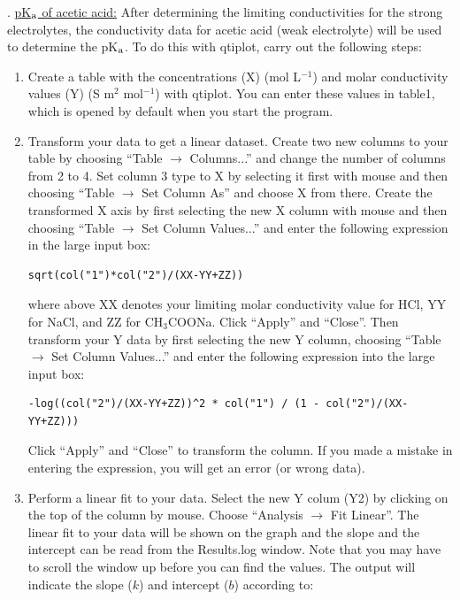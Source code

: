 \documentclass[byrevtex,amssymb,aps,pra,floatfix,letterpaper]{revtex4}
\begin{document}
. \underline{pK$_\textnormal{a}$ of acetic acid:} After determining the limiting conductivities for the strong electrolytes, the conductivity data for acetic acid (weak electrolyte) will be used to determine the pK$_\textnormal{a}$. To do this with qtiplot, carry out the following steps:

\begin{enumerate}
\item Create a table with the concentrations (X) (mol L$^{-1}$) and molar conductivity values (Y) (S m$^2$ mol$^{-1}$) with qtiplot. You can enter these values in table1, which is opened by default when you start the program.
\item Transform your data to get a linear dataset. Create two new columns to your table by choosing ``Table $\rightarrow$ Columns...'' and change the number of columns from 2 to 4. Set column 3 type to X by selecting it first with mouse and then choosing ``Table $\rightarrow$ Set Column As'' and choose X from there. Create the transformed X axis by first selecting the new X column with mouse and then choosing ``Table $\rightarrow$ Set Column Values...'' and enter the following expression in the large input box:

\begin{verbatim}
sqrt(col("1")*col("2")/(XX-YY+ZZ))
\end{verbatim}

where above XX denotes your limiting molar conductivity value for HCl, YY for NaCl, and ZZ for CH$_3$COONa. Click ``Apply'' and ``Close''. Then transform your Y data by first selecting the new Y column, choosing ``Table $\rightarrow$ Set Column Values...'' and enter the following expression into the large input box:

\begin{verbatim}
-log((col("2")/(XX-YY+ZZ))^2 * col("1") / (1 - col("2")/(XX-YY+ZZ)))
\end{verbatim}

Click ``Apply'' and ``Close'' to transform the column. If you made a mistake in entering the expression, you will get an error (or wrong data).

\item Perform a linear fit to your data. Select the new Y colum (Y2) by clicking on the top of the column by mouse. Choose ``Analysis $\rightarrow$ Fit Linear''. The linear fit to your data will be shown on the graph and the slope and the intercept can be read from the Results.log window. Note that you may have to scroll the window up before you can find the values. The output will indicate the slope ($k$) and intercept ($b$) according to:


\end{enumerate}
\end{document}
